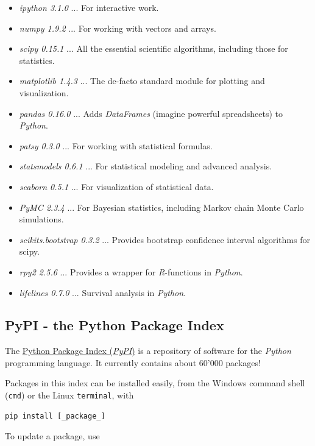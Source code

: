 \begin{itemize}
  \item \emph{ipython 3.1.0} ... For interactive work.
  \item \emph{numpy 1.9.2} ... For working with vectors and arrays.
  \item \emph{scipy 0.15.1} ... All the essential scientific algorithms, including those for statistics.
  \item \emph{matplotlib 1.4.3} ... The de-facto standard module for plotting and visualization.
  \item \emph{pandas 0.16.0} ... Adds \emph{DataFrames} (imagine powerful spreadsheets) to \emph{Python}.
  \item \emph{patsy 0.3.0} ... For working with statistical formulas.
  \item \emph{statsmodels 0.6.1} ... For statistical modeling and advanced analysis.
  \item \emph{seaborn 0.5.1} ... For visualization of statistical data.
  \item \emph{PyMC 2.3.4} ... For Bayesian statistics, including Markov chain Monte Carlo simulations.
  \item \emph{scikits.bootstrap 0.3.2} ... Provides bootstrap confidence interval algorithms for scipy.
  \item \emph{rpy2 2.5.6} ... Provides a wrapper for \emph{R}-functions in \emph{Python}.
  \item \emph{lifelines 0.7.0} ... Survival analysis in \emph{Python}.
\end{itemize}

\subsection{PyPI - the Python Package Index}

The \href{https://pypi.python.org/pypi}{Python Package Index (\emph{PyPI})} is a repository of software for the \emph{Python} programming language. It currently contains about 60'000 packages!

Packages in this index can be installed easily, from the Windows command shell (\lstinline{cmd}) or the Linux \lstinline{terminal}, with

\begin{lstlisting}[language=Python]
    pip install [_package_]
\end{lstlisting}

To update a package, use

